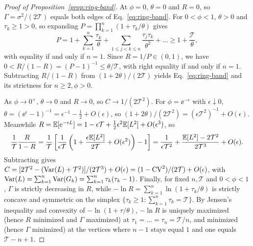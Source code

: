 \begin{proof}[Proof of Proposition~{\upshape\ref{prop:ring-band}}]
At $\phi = 0$, $\theta = 0$ and $R = 0$, so $\Gamma = \sigma^2/(2\mathcal{T})$ equals both edges of Eq.~\eqref{eq:ring-band}. For $0 < \phi < 1$, $\theta > 0$ and $\tau_k \ge 1 > 0$, so expanding $P = \prod_{k=1}^n (1 + \tau_k/\theta)$ gives
\[
P = 1 + \sum_{k=1}^n \frac{\tau_k}{\theta} + \sum_{1 \le j < k \le n} \frac{\tau_j\tau_k}{\theta^2} + \dots \ge 1 + \frac{\mathcal{T}}{\theta},
\]
with equality if and only if $n = 1$. Since $R = 1/P \in (0, 1)$, we have $0 < R/(1 - R) = (P - 1)^{-1} \le \theta/\mathcal{T}$, with right equality if and only if $n = 1$. Subtracting $R/(1 - R)$ from $(1 + 2\theta)/(2\mathcal{T})$ yields Eq.~\eqref{eq:ring-band} and its strictness for $n \ge 2, \phi > 0$.

As $\phi \to 0^+$, $\theta \to 0$ and $R \to 0$, so $C \to 1/(2\mathcal{T}^2)$. For $\phi = \ee^{-\epsilon}$ with $\epsilon \downarrow 0$, $\theta = (\ee^\epsilon - 1)^{-1} = \epsilon^{-1} - \frac{1}{2} + O(\epsilon)$, so $(1 + 2\theta)/(2\mathcal{T}^2) = (\epsilon\mathcal{T}^2)^{-1} + O(\epsilon)$. Meanwhile $R = \mathbb{E}[\mathrm{e}^{-\epsilon L}] = 1 - \epsilon\mathcal{T} + \frac{1}{2}\epsilon^2\mathbb{E}[L^2] + O(\epsilon^3)$, so
\[
\frac{1}{\mathcal{T}}\frac{R}{1 - R} = \frac{1}{\mathcal{T}}\left[\frac{1}{\epsilon\mathcal{T}}\left(1 + \frac{\epsilon\mathbb{E}[L^2]}{2\mathcal{T}} + O(\epsilon^2)\right) - 1\right] = \frac{1}{\epsilon\mathcal{T}^2} + \frac{\mathbb{E}[L^2] - 2\mathcal{T}^2}{2\mathcal{T}^3} + O(\epsilon).
\]
Subtracting gives $C = [2\mathcal{T}^2 - (\operatorname{Var}(L) + \mathcal{T}^2)]/(2\mathcal{T}^3) + O(\epsilon) = (1 - \mathrm{CV}^2)/(2\mathcal{T}) + O(\epsilon)$, with $\operatorname{Var}(L) = \sum_{k=1}^n \operatorname{Var}(G_k) = \sum_{k=1}^n \tau_k(\tau_k - 1)$. Finally, for fixed $n, \mathcal{T}$ and $0 < \phi < 1$, $\Gamma$ is strictly decreasing in $R$, while $-\ln R = \sum_{k=1}^n \ln(1 + \tau_k/\theta)$ is strictly concave and symmetric on the simplex $\{\tau_k \ge 1 : \sum_{k=1}^n \tau_k = \mathcal{T}\}$. By Jensen's inequality and convexity of $- \ln(1 + \tau/\theta)$, $-\ln R$ is uniquely maximized (hence $R$ minimized and $\Gamma$ maximized) at $\tau_1 = \dots = \tau_n = \mathcal{T}/n$, and minimized (hence $\Gamma$ minimized) at the vertices where $n - 1$ stays equal $1$ and one equals $\mathcal{T} - n + 1$.
\end{proof}

